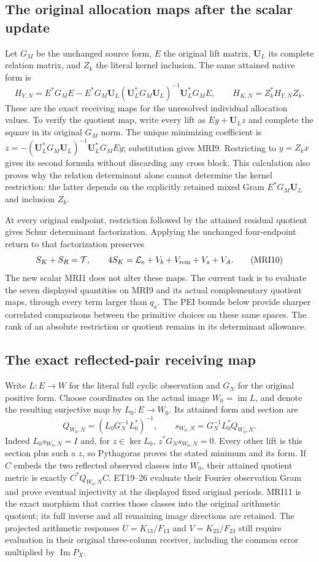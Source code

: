 \documentclass[11pt,a4paper]{article}
\begin{document}
\subsection{The original allocation maps after the scalar update}
Let $G_M$ be the unchanged source form, $E$ the original lift matrix,
$\mathbf U_L$ its complete relation matrix, and $Z_k$ the literal
kernel inclusion. The same attained native form is
\[
 H_{Y,N}=E^*G_ME-E^*G_M\mathbf U_L
    (\mathbf U_L^*G_M\mathbf U_L)^{-1}\mathbf U_L^*G_ME,
 \qquad H_{K,N}=Z_k^*H_{Y,N}Z_k.
 \tag{MRI9}
\]
These are the exact receiving maps for the unresolved individual
allocation values. To verify the quotient map, write every lift as
$Ey+\mathbf U_Lz$ and complete the square in its original $G_M$
norm. The unique minimizing coefficient is
$z=-(\mathbf U_L^*G_M\mathbf U_L)^{-1}\mathbf U_L^*G_MEy$;
substitution gives MRI9. Restricting to $y=Z_kx$ gives its second
formula without discarding any cross block. This calculation also
proves why the relation determinant alone cannot determine the
kernel restriction: the latter depends on the explicitly retained
mixed Gram $E^*G_M\mathbf U_L$ and inclusion $Z_k$.

At every original endpoint, restriction followed by the attained
residual quotient gives Schur determinant factorization. Applying
the unchanged four-endpoint return to that factorization preserves
\[
 S_K+S_R=\mathcal T,\qquad
 4S_K=\mathcal L_e+V_b+V_{\rm rem}+V_s+V_A.
 \tag{MRI10}
\]
The new scalar MRI1 does not alter these maps. The current task is
to evaluate the seven displayed quantities on MRI9 and its actual
complementary quotient maps, through every term larger than $q_a$.
The PEI bounds below provide sharper correlated comparisons between
the primitive choices on these same spaces. The rank of an absolute
restriction or quotient remains in its determinant allowance.

\subsection{The exact reflected-pair receiving map}
Write $L:E\to W$ for the literal full cyclic observation and
$G_N$ for the original positive form. Choose coordinates on the
actual image $W_0=\operatorname{im}L$, and denote the resulting
surjective map by $L_0:E\to W_0$. Its attained form and section are
\[
 Q_{W_0,N}=(L_0G_N^{-1}L_0^*)^{-1},\qquad
 s_{W_0,N}=G_N^{-1}L_0^*Q_{W_0,N}.
 \tag{MRI11}
\]
Indeed $L_0s_{W_0,N}=I$ and, for $z\in\ker L_0$,
$z^*G_Ns_{W_0,N}=0$. Every other lift is this section plus such a
$z$, so Pythagoras proves the stated minimum and its form.
If $C$ embeds the two reflected observed classes into $W_0$, their
attained quotient metric is exactly $C^*Q_{W_0,N}C$. ET19--26
evaluate their Fourier observation Gram and prove eventual
injectivity at the displayed fixed original periods. MRI11 is
the exact morphism that carries those classes into the original
arithmetic quotient; its full inverse and all remaining image
directions are retained. The projected arithmetic responses
$U=K_{13}/F_{13}$ and $V=K_{23}/F_{23}$ still require evaluation
in their original three-column receiver, including the common
error multiplied by $\operatorname{Im}P_X$.
\end{document}
